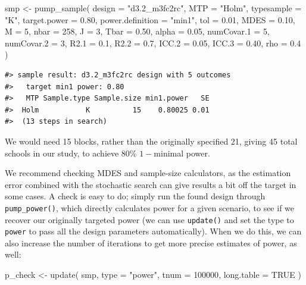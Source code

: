 \documentclass[
]{article}
\newenvironment{Shaded}{\begin{snugshade}}{\end{snugshade}}
\newcommand{\AttributeTok}[1]{\textcolor[rgb]{0.77,0.63,0.00}{#1}}
\newcommand{\ConstantTok}[1]{\textcolor[rgb]{0.00,0.00,0.00}{#1}}
\newcommand{\DecValTok}[1]{\textcolor[rgb]{0.00,0.00,0.81}{#1}}
\newcommand{\FloatTok}[1]{\textcolor[rgb]{0.00,0.00,0.81}{#1}}
\newcommand{\FunctionTok}[1]{\textcolor[rgb]{0.00,0.00,0.00}{#1}}
\newcommand{\NormalTok}[1]{#1}
\newcommand{\OtherTok}[1]{\textcolor[rgb]{0.56,0.35,0.01}{#1}}
\newcommand{\StringTok}[1]{\textcolor[rgb]{0.31,0.60,0.02}{#1}}
\begin{document}
\begin{Shaded}
\begin{Highlighting}[]
\NormalTok{smp }\OtherTok{\textless{}{-}} \FunctionTok{pump\_sample}\NormalTok{(}
  \AttributeTok{design =} \StringTok{"d3.2\_m3fc2rc"}\NormalTok{,}
  \AttributeTok{MTP =} \StringTok{"Holm"}\NormalTok{,}
  \AttributeTok{typesample =} \StringTok{"K"}\NormalTok{,}
  \AttributeTok{target.power =} \FloatTok{0.80}\NormalTok{, }\AttributeTok{power.definition =} \StringTok{"min1"}\NormalTok{, }\AttributeTok{tol =} \FloatTok{0.01}\NormalTok{,}
  \AttributeTok{MDES =} \FloatTok{0.10}\NormalTok{, }\AttributeTok{M =} \DecValTok{5}\NormalTok{, }\AttributeTok{nbar =} \DecValTok{258}\NormalTok{, }\AttributeTok{J =} \DecValTok{3}\NormalTok{,}
  \AttributeTok{Tbar =} \FloatTok{0.50}\NormalTok{, }\AttributeTok{alpha =} \FloatTok{0.05}\NormalTok{, }\AttributeTok{numCovar.1 =} \DecValTok{5}\NormalTok{, }\AttributeTok{numCovar.2 =} \DecValTok{3}\NormalTok{,}
  \AttributeTok{R2.1 =} \FloatTok{0.1}\NormalTok{, }\AttributeTok{R2.2 =} \FloatTok{0.7}\NormalTok{, }\AttributeTok{ICC.2 =} \FloatTok{0.05}\NormalTok{, }\AttributeTok{ICC.3 =} \FloatTok{0.40}\NormalTok{, }\AttributeTok{rho =} \FloatTok{0.4}\NormalTok{ )}
\end{Highlighting}
\end{Shaded}

\begin{verbatim}
#> sample result: d3.2_m3fc2rc design with 5 outcomes
#>   target min1 power: 0.80
#>   MTP Sample.type Sample.size min1.power   SE
#>  Holm           K          15    0.80025 0.01
#>  (13 steps in search)
\end{verbatim}

We would need 15 blocks, rather than the originally specified 21, giving
45 total schools in our study, to achieve 80\% \(1-\)minimal power.

We recommend checking MDES and sample-size calculators, as the
estimation error combined with the stochastic search can give results a
bit off the target in some cases. A check is easy to do; simply run the
found design through \texttt{pump\_power()}, which directly calculates
power for a given scenario, to see if we recover our originally targeted
power (we can use \texttt{update()} and set the type to \texttt{power}
to pass all the design parameters automatically). When we do this, we
can also increase the number of iterations to get more precise estimates
of power, as well:

\begin{Shaded}
\begin{Highlighting}[]
\NormalTok{p\_check }\OtherTok{\textless{}{-}} \FunctionTok{update}\NormalTok{( smp, }\AttributeTok{type =} \StringTok{"power"}\NormalTok{, }\AttributeTok{tnum =} \DecValTok{100000}\NormalTok{,}
                   \AttributeTok{long.table =} \ConstantTok{TRUE}\NormalTok{ )}
\end{Highlighting}
\end{Shaded}
\end{document}
